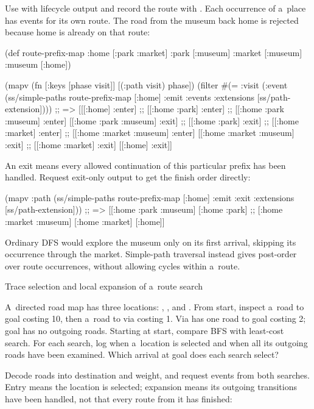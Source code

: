 {{{\smallskip
{} Use  with lifecycle output and
record the route with . Each occurrence of a~place
has events for its own route. The road from the museum back home is rejected
because home is already on that route:

\begtt {}
(def route-prefix-map
  {:home [:park :market]
   :park [:museum]
   :market [:museum]
   :museum [:home]})

(mapv (fn [{:keys [phase visit]}] [(:path visit) phase])
      (filter #(= :visit (:event %
      (ss/simple-paths route-prefix-map [:home]
                       {:emit :events :extensions [ss/path-extension]})))
;; => [[[:home] :enter]
;;     [[:home :park] :enter]
;;     [[:home :park :museum] :enter] [[:home :park :museum] :exit]
;;     [[:home :park] :exit]
;;     [[:home :market] :enter]
;;     [[:home :market :museum] :enter] [[:home :market :museum] :exit]
;;     [[:home :market] :exit] [[:home] :exit]]
\endtt

An exit means every allowed continuation of this particular prefix has
been handled. Request exit-only output to get the finish order directly:

\begtt {}
(mapv :path
      (ss/simple-paths route-prefix-map [:home]
                       {:emit :exit :extensions [ss/path-extension]}))
;; => [[:home :park :museum] [:home :park]
;;     [:home :market :museum] [:home :market] [:home]]
\endtt

Ordinary DFS would explore the museum only on its first arrival, skipping
its occurrence through the market. Simple-path traversal instead gives
post-order over route occurrences, without allowing cycles within a~route.

\secc Trace selection and local expansion of a~route search

 A~directed road map has three locations:
, , and . From start, inspect a~road
to goal costing 10, then a~road to via costing 1. Via has one road to goal
costing 2; goal has no outgoing roads. Starting at start, compare BFS
with least-cost search. For each search, log when a~location is selected
and when all its outgoing roads have been examined. Which arrival at goal
does each search select?

\smallskip
{} Decode roads into destination and weight, and
request events from both searches. Entry means the location is selected;
expansion means its outgoing transitions have been handled, not that every
route from it has finished:

}}}
